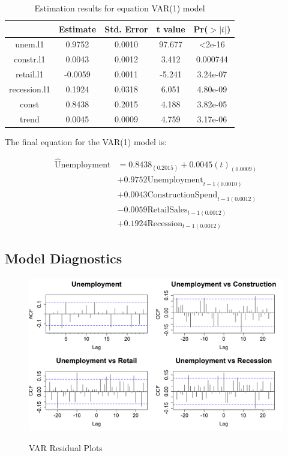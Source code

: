 \documentclass[twoside,twocolumn]{article}
\begin{document}
{\small
\begin{table}[htb]
\centering
\caption{Estimation results for equation VAR(1) model}
\label{tab:estimates}
\begin{tabular}{@{}ccccc@{}}
\toprule
& Estimate & Std. Error & t value & Pr(\(>|t|\))     \\ \midrule
unem.l1      & 0.9752  & 0.0010 & 97.677 & \textless  2e-16 \\
constr.l1    & 0.0043 & 0.0012 & 3.412  & 0.000744 \\
retail.l1    & -0.0059 & 0.0011 & -5.241 & 3.24e-07 \\
recession.l1 & 0.1924  & 0.0318 & 6.051  & 4.80e-09 \\
const        & 0.8438  & 0.2015 & 4.188  & 3.82e-05 \\
trend        & 0.0045  & 0.0009 & 4.759  & 3.17e-06 \\ \bottomrule
\end{tabular}
\end{table}}

The final equation for the VAR(1) model is:

 \begin{align*}
  \widehat{\text{U}}\text{nemployment} &= 0.8438_{(0.2015)} +
  0.0045(t)_{(0.0009)}\\
  &+ 0.9752\text{Unemployment}_{t-1 (0.0010)}\\
  &+ 0.0043\text{ConstructionSpend}_{t-1(0.0012)}\\
  &- 0.0059\text{RetailSales}_{t-1(0.0012)}\\
  &+ 0.1924\text{Recession}_{t-1(0.0012)}
  \end{align*}

 \subsection{Model Diagnostics}
 \begin{figure}[hbt]
	\centering
	\caption{VAR Residual Plots}
	\includegraphics[width=\linewidth]{images/CCFplots}
	\label{fig:CCF}
\end{figure}
\end{document}
